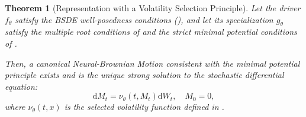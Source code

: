 \documentclass[qian]{imsart}
\newcommand{\dd}{\mathrm{d}}
\theoremstyle{plain}
\newtheorem{theorem}{Theorem}[section]
\theoremstyle{definition}
\begin{document}
\begin{theorem}[Representation with a Volatility Selection Principle]
\label{thm:nbm_representation_selection}
Let the driver $f_\theta$ satisfy the BSDE well-posedness conditions (), and let its specialization $g_\theta$ satisfy the multiple root conditions of  and the strict minimal potential conditions of .

Then, a canonical Neural-Brownian Motion consistent with the minimal potential principle exists and is the unique strong solution to the stochastic differential equation:
\[
    \dd M_t = \nu_\theta(t, M_t) \dd W_t, \quad M_0 = 0,
\]
where $\nu_\theta(t,x)$ is the selected volatility function defined in .
\end{theorem}
\end{document}

